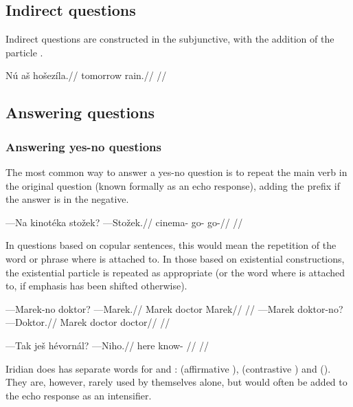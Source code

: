 \subsection{Indirect questions}

Indirect questions are constructed in the subjunctive, with the addition of the particle .

\pex
\begingl
\gla N\'u a\v{s} ho\v{s}ez\'ila.//
\glb tomorrow  rain.//
\glft {}//
\endgl
\xe

\subsection{Answering questions}

\subsubsection{Answering yes-no questions}
The most common way to answer a yes-no question is to repeat the main verb in the original question (known formally as an echo response), adding the prefix  if the answer is in the negative.

\pex
\begingl
\gla ---Na kinot\'eka sto\v{z}ek? ---Sto\v{z}ek.//
\glb {} cinema- go- go-//
\glft {}//
\endgl
\xe

In questions based on copular sentences, this would mean the repetition of the word or phrase where  is attached to. In those based on existential constructions, the existential particle is repeated as appropriate (or the word where  is attached to, if emphasis has been shifted otherwise).

\pex
\a
\begingl
\gla ---Marek-no doktor? ---Marek.//
\glb Marek doctor Marek//
\glft {}//
\endgl
\a
\begingl
\gla ---Marek doktor-no? ---Doktor.//
\glb Marek doctor doctor//
\glft {}//
\endgl
\xe

\pex
\begingl
\gla ---Tak je\v{s} h\'evorn\'al? ---Niho.//
\glb here  know- //
\glft {}//
\endgl
\xe

Iridian does has separate words for  and :  (affirmative ),  (contrastive ) and  (). They are, however, rarely used by themselves alone, but would often be added to the echo response as an intensifier.

